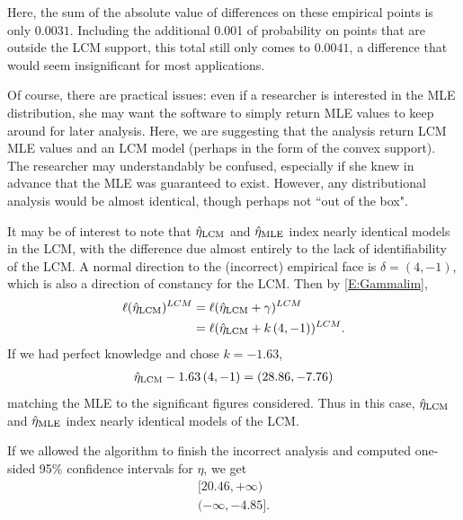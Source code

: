 Here, the sum of the absolute value of differences on these empirical points is only 
$0.0031$.  Including the additional 0.001 of probability on points that are outside 
the LCM support, this total still only comes to $0.0041$, a difference that would seem 
insignificant for most applications.  

Of course, there are practical issues: even if a researcher is interested in the 
MLE distribution, she may want the software to simply 
return MLE values to keep around for later analysis.  Here, we are suggesting that the 
analysis return LCM MLE values and an LCM model (perhaps in the form of the convex 
support).  The researcher may understandably be confused, especially if she knew in 
advance that the MLE was guaranteed to exist.  However, any distributional analysis 
would be almost identical, though perhaps not ``out of the box".

It may be of interest to note that $\hat{\eta}_{\textrm{LCM}}$ and $\hat{\eta}_{\textrm{MLE}}$ index nearly identical 
models in the LCM, with the difference due almost entirely to the lack of 
identifiability of the LCM.  A normal direction to the (incorrect) empirical face is 
$\delta = (4,-1)$, which is also a direction of constancy for the LCM. 
Then by \eqref{E:Gammalim}, 
\begin{align*}
	\ell(\hat{\eta}_{\textrm{LCM}})^{LCM} &= \ell( \hat{\eta}_{\textrm{LCM}} + \gamma )^{LCM}\\
				 &= 	\ell(\hat{\eta}_{\textrm{LCM}} + k \, (4,-1))^{LCM}.
\end{align*}
If we had perfect knowledge and chose $k = -1.63$,
\begin{align*}
	\hat{\eta}_{\textrm{LCM}}  -1.63 \, (4,-1)= (28.86, -7.76) 
\end{align*}
matching the MLE to the significant figures considered.  Thus in this case, $\hat{\eta}_{\textrm{LCM}}$ 
and $\hat{\eta}_{\textrm{MLE}}$ index nearly identical models of the LCM.

If we allowed the algorithm to finish the incorrect analysis and computed 
one-sided 95\% confidence intervals for $\eta$, we get 
\begin{align*}
	[20.46, +\infty)\\
	(-\infty, -4.85].
\end{align*}


